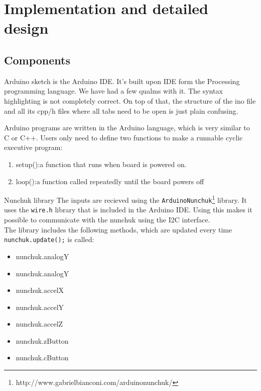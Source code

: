 \chapter{Implementation and detailed design} %

\section{Components}
Arduino sketch is the Arduino IDE. It's built upon IDE form the Processing programming language. We have had a few qualms with it. The syntax highlighting is not completely correct. On top of that, the structure of the ino file and all its cpp/h files where all tabs need to be open is just plain confusing.

Arduino programs are written in the Arduino language, which is very similar to C or C++. Users only need to define two functions to make a runnable cyclic executive program: 
\begin{enumerate}
\item setup():a function that runs when board is powered on.
\item loop():a function called repeatedly until the board powers off
\end{enumerate}
Nunchuk library
The inputs are recieved using the {\tt ArduinoNunchuk}\footnote{http://www.gabrielbianconi.com/arduinonunchuk/} library.
It uses the {\tt wire.h} library that is included in the Arduino IDE.
Using this makes it possible to communicate with the
nunchuk using the I2C interface.\\
The library includes the following methods, which are updated every time {\tt nunchuk.update();} is called:
\begin{multicols}{3}
\begin{itemize}
    \item nunchuk.analogY
    \item nunchuk.analogY
    \item nunchuk.accelX
    \item nunchuk.accelY
    \item nunchuk.accelZ
    \item nunchuk.zButton
    \item nunchuk.cButton
\end{itemize}
\end{multicols}


